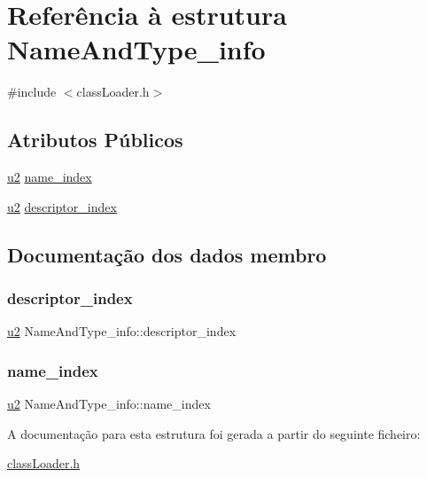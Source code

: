 \hypertarget{struct_name_and_type__info}{}\section{Referência à estrutura Name\+And\+Type\+\_\+info}
\label{struct_name_and_type__info}


{\ttfamily \#include $<$class\+Loader.\+h$>$}

\subsection*{Atributos Públicos}
\begin{DoxyCompactItemize}
\item 
\hyperlink{util_8h_a55ef8d87fd202b8417704c089899c5b9}{u2} \hyperlink{struct_name_and_type__info_a05a02daa8bbb5e12e7db1dec73c5e6d2}{name\+\_\+index}
\item 
\hyperlink{util_8h_a55ef8d87fd202b8417704c089899c5b9}{u2} \hyperlink{struct_name_and_type__info_ad298ac8fab5c86eb22f04553ca57e05c}{descriptor\+\_\+index}
\end{DoxyCompactItemize}


\subsection{Documentação dos dados membro}
\mbox{\label{struct_name_and_type__info_ad298ac8fab5c86eb22f04553ca57e05c}} 
\subsubsection{\texorpdfstring{descriptor\+\_\+index}{descriptor\_index}}
{\footnotesize\ttfamily \hyperlink{util_8h_a55ef8d87fd202b8417704c089899c5b9}{u2} Name\+And\+Type\+\_\+info\+::descriptor\+\_\+index}

\mbox{\label{struct_name_and_type__info_a05a02daa8bbb5e12e7db1dec73c5e6d2}} 
\subsubsection{\texorpdfstring{name\+\_\+index}{name\_index}}
{\footnotesize\ttfamily \hyperlink{util_8h_a55ef8d87fd202b8417704c089899c5b9}{u2} Name\+And\+Type\+\_\+info\+::name\+\_\+index}



A documentação para esta estrutura foi gerada a partir do seguinte ficheiro\+:\begin{DoxyCompactItemize}
\item 
\hyperlink{class_loader_8h}{class\+Loader.\+h}\end{DoxyCompactItemize}
